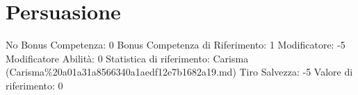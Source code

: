 \section{Persuasione}\label{persuasione}

\begin{description}
\tightlist
\item[Tags: ABI]
No Bonus Competenza: 0 Bonus Competenza di Riferimento: 1 Modificatore:
-5 Modificatore Abilità: 0 Statistica di riferimento: Carisma
(Carisma\%20a01a31a8566340a1aedf12e7b1682a19.md) Tiro Salvezza: -5
Valore di riferimento: 0
\end{description}
